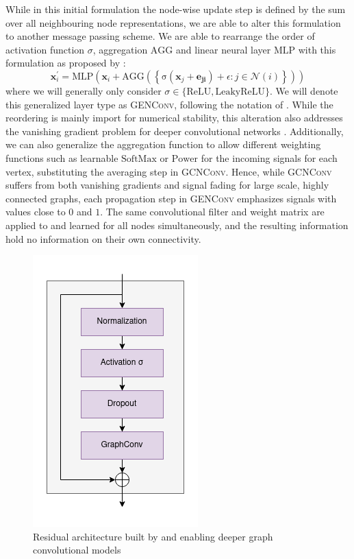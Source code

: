 \documentclass{bioinfo}
\renewcommand{\cite}{\citep}
\begin{document}
While in this initial formulation the node-wise update step is defined
by the sum over all neighbouring node representations, we are able to
alter this formulation to another message passing scheme.  We are able
to rearrange the order of activation function $\sigma$, aggregation
$\mathrm{AGG}$ and linear neural layer $\mathrm{MLP}$ with this
formulation as proposed by \citet{GENConv2020}:
\begin{equation}
	\mathbf{x}_i^{\prime} = \mathrm{MLP} \left( \mathbf{x}_i +
	\mathrm{AGG} \left( \left\{
	\mathrm{\sigma} \left( \mathbf{x}_j + \mathbf{e_{ji}} \right) +\epsilon
	: j \in \mathcal{N}(i) \right\} \right)
	\right)
\end{equation}
where we will generally only consider
$\sigma \in \{\mathrm{ReLU}, \mathrm{LeakyReLU}\}$. We will denote
this generalized layer type as \textsc{GENConv}, following the
notation of \citet{PytorchGeometric}.  While the reordering is mainly
import for numerical stability, this alteration also addresses the
vanishing gradient problem for deeper convolutional networks
\cite{GENConv2020}. Additionally, we can also generalize the
aggregation function to allow different weighting functions such as
learnable $\mathrm{SoftMax}$ or $\mathrm{Power}$ for the incoming
signals for each vertex, substituting the averaging step in
\textsc{GCNConv}. Hence, while \textsc{GCNConv} suffers from both
vanishing gradients and signal fading for large scale, highly
connected graphs, each propagation step in \textsc{GENConv} emphasizes
signals with values close to $0$ and $1$. The same convolutional
filter and weight matrix are applied to and learned for all nodes
simultaneously, and the resulting information hold no information on their own connectivity.

\begin{figure}[!tpb]%
	\centerline{\includegraphics[width=0.5\columnwidth]{figures/ResGraphConvBlocks.png}}
	\caption{Residual architecture built by \citet{DeepGCN2019} and \citet{DeeperGCN2020} enabling deeper graph convolutional models}
	\label{fig:ResGraphConvBlocks}
\end{figure}
\end{document}
